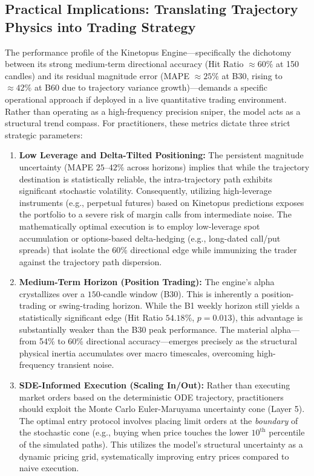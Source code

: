 \documentclass[11pt,a4paper]{article}
\begin{document}
\subsection{Practical Implications: Translating Trajectory Physics into Trading Strategy}
\label{sec:practical_implications}

The performance profile of the Kinetopus Engine---specifically the dichotomy between its strong medium-term directional accuracy (Hit Ratio $\approx 60\%$ at 150 candles) and its residual magnitude error (MAPE $\approx 25\%$ at B30, rising to $\approx 42\%$ at B60 due to trajectory variance growth)---demands a specific operational approach if deployed in a live quantitative trading environment. Rather than operating as a high-frequency precision sniper, the model acts as a structural trend compass. For practitioners, these metrics dictate three strict strategic parameters:

\begin{enumerate}
    \item \textbf{Low Leverage and Delta-Tilted Positioning:} The persistent magnitude uncertainty (MAPE $25$--$42\%$ across horizons) implies that while the trajectory destination is statistically reliable, the intra-trajectory path exhibits significant stochastic volatility. Consequently, utilizing high-leverage instruments (e.g., perpetual futures) based on Kinetopus predictions exposes the portfolio to a severe risk of margin calls from intermediate noise. The mathematically optimal execution is to employ low-leverage spot accumulation or options-based delta-hedging (e.g., long-dated call/put spreads) that isolate the $60\%$ directional edge while immunizing the trader against the trajectory path dispersion.
    \item \textbf{Medium-Term Horizon (Position Trading):} The engine's alpha crystallizes over a $150$-candle window (B30). This is inherently a position-trading or swing-trading horizon. While the B1 weekly horizon still yields a statistically significant edge (Hit Ratio $54.18\%$, $p = 0.013$), this advantage is substantially weaker than the B30 peak performance. The material alpha---from 54\% to 60\% directional accuracy---emerges precisely as the structural physical inertia accumulates over macro timescales, overcoming high-frequency transient noise.
    \item \textbf{SDE-Informed Execution (Scaling In/Out):} Rather than executing market orders based on the deterministic ODE trajectory, practitioners should exploit the Monte Carlo Euler-Maruyama uncertainty cone (Layer 5). The optimal entry protocol involves placing limit orders at the \textit{boundary} of the stochastic cone (e.g., buying when price touches the lower $10^{\text{th}}$ percentile of the simulated paths). This utilizes the model's structural uncertainty as a dynamic pricing grid, systematically improving entry prices compared to naive execution.
\end{enumerate}
\end{document}
